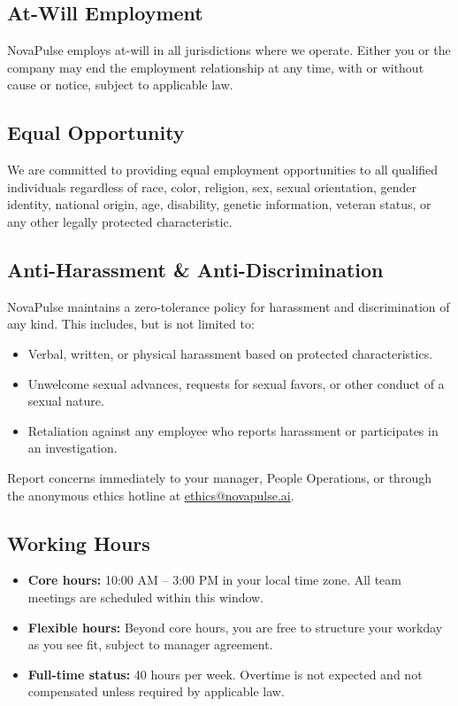 \documentclass[
    language=english,
    doctype=employee-handbook,
    institution=none,
]{../../omnilatex}
\begin{document}
\subsection{At-Will Employment}

NovaPulse employs at-will in all jurisdictions where we operate. Either you
or the company may end the employment relationship at any time, with or
without cause or notice, subject to applicable law.

\subsection{Equal Opportunity}

We are committed to providing equal employment opportunities to all qualified
individuals regardless of race, color, religion, sex, sexual orientation,
gender identity, national origin, age, disability, genetic information,
veteran status, or any other legally protected characteristic.

\subsection{Anti-Harassment \& Anti-Discrimination}

NovaPulse maintains a zero-tolerance policy for harassment and discrimination
of any kind. This includes, but is not limited to:

\begin{itemize}
    \item Verbal, written, or physical harassment based on protected
          characteristics.
    \item Unwelcome sexual advances, requests for sexual favors, or other
          conduct of a sexual nature.
    \item Retaliation against any employee who reports harassment or
          participates in an investigation.
\end{itemize}

Report concerns immediately to your manager, People Operations, or through the
anonymous ethics hotline at \href{mailto:ethics@novapulse.ai}{ethics@novapulse.ai}.

\subsection{Working Hours}

\begin{itemize}
    \item \textbf{Core hours:} 10:00 AM -- 3:00 PM in your local time zone.
          All team meetings are scheduled within this window.
    \item \textbf{Flexible hours:} Beyond core hours, you are free to structure
          your workday as you see fit, subject to manager agreement.
    \item \textbf{Full-time status:} 40 hours per week. Overtime is not
          expected and not compensated unless required by applicable law.
\end{itemize}
\end{document}
